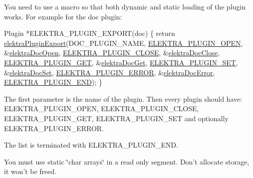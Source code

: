 You need to use a macro so that both dynamic and static loading of the plugin works. For example for the doc plugin\+: 
\begin{DoxyCodeInclude}
Plugin *ELEKTRA\_PLUGIN\_EXPORT(doc)
\{
        \textcolor{keywordflow}{return} \hyperlink{group__plugin_ga8dd092048e972a3f0c9c9f54eb41576e}{elektraPluginExport}(DOC\_PLUGIN\_NAME,
                \hyperlink{kdbplugin_8h_afed89ef026fb0622918a5de020de7814ab7e2dcc6e79af21dd90d2bb62920551d}{ELEKTRA\_PLUGIN\_OPEN}, &\hyperlink{group__plugin_ga23c2eb3584e38a4d494eb8f91e5e3d8d}{elektraDocOpen},
                \hyperlink{kdbplugin_8h_afed89ef026fb0622918a5de020de7814a449e166b322550b3ad26efd4c46e49e3}{ELEKTRA\_PLUGIN\_CLOSE},       &\hyperlink{group__plugin_ga1236aefe5b2baf8b7bf636ba5aa9ea29}{elektraDocClose},
                \hyperlink{kdbplugin_8h_afed89ef026fb0622918a5de020de7814a3d5f4a887e68878f1cc3a75985194204}{ELEKTRA\_PLUGIN\_GET},   &\hyperlink{group__plugin_gacb69f3441c6d84241b4362f958fbe313}{elektraDocGet},
                \hyperlink{kdbplugin_8h_afed89ef026fb0622918a5de020de7814a85c9545261cf0bcc932616e67ea3b70a}{ELEKTRA\_PLUGIN\_SET},   &\hyperlink{group__plugin_gae65781a1deb34efc79c8cb9d9174842c}{elektraDocSet},
                \hyperlink{kdbplugin_8h_afed89ef026fb0622918a5de020de7814a89e027283d949dd78bb9c1fce1b19a10}{ELEKTRA\_PLUGIN\_ERROR},       &\hyperlink{group__plugin_gad74b35f558ac7c3262f6069c5c47dc79}{elektraDocError},
                \hyperlink{kdbplugin_8h_afed89ef026fb0622918a5de020de7814a64a0bc789482284d9fd27ce974e0959a}{ELEKTRA\_PLUGIN\_END});
\}
\end{DoxyCodeInclude}
 The first parameter is the name of the plugin. Then every plugin should have\+: {\ttfamily E\+L\+E\+K\+T\+R\+A\+\_\+\+P\+L\+U\+G\+I\+N\+\_\+\+O\+P\+E\+N}, {\ttfamily E\+L\+E\+K\+T\+R\+A\+\_\+\+P\+L\+U\+G\+I\+N\+\_\+\+C\+L\+O\+S\+E}, {\ttfamily E\+L\+E\+K\+T\+R\+A\+\_\+\+P\+L\+U\+G\+I\+N\+\_\+\+G\+E\+T}, {\ttfamily E\+L\+E\+K\+T\+R\+A\+\_\+\+P\+L\+U\+G\+I\+N\+\_\+\+S\+E\+T} and optionally {\ttfamily E\+L\+E\+K\+T\+R\+A\+\_\+\+P\+L\+U\+G\+I\+N\+\_\+\+E\+R\+R\+O\+R}.

The list is terminated with {\ttfamily E\+L\+E\+K\+T\+R\+A\+\_\+\+P\+L\+U\+G\+I\+N\+\_\+\+E\+N\+D}.

You must use static \char`\"{}char arrays\char`\"{} in a read only segment. Don't allocate storage, it won't be freed.


